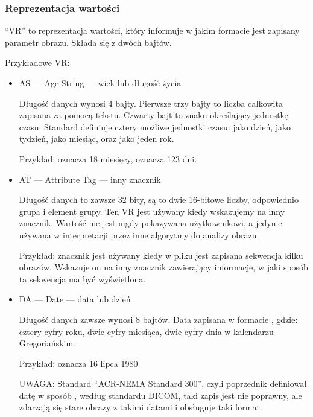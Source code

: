 \subsubsection{Reprezentacja wartości}
\label{sec:dicom-vr}

\enquote{VR} to reprezentacja wartości, który informuje w jakim formacie jest zapisany parametr obrazu.
Składa się z dwóch bajtów.

Przykładowe VR:
\begin{itemize}
    \item AS --- Age String --- wiek lub długość życia

          Długość danych wynosi 4 bajty.
          Pierwsze trzy bajty to liczba całkowita zapisana za pomocą tekstu.
          Czwarty bajt to znaku określający jednostkę czasu.
          Standard definiuje cztery możliwe jednostki czasu:  jako dzień,  jako tydzień,  jako miesiąc, oraz  jako jeden rok.

          Przykład:  oznacza 18 miesięcy,  oznacza 123 dni.

    \item AT --- Attribute Tag --- inny znacznik

          Długość danych to zawsze 32 bity, są to dwie 16-bitowe liczby, odpowiednio grupa i element grupy.
          Ten VR jest używany kiedy wskazujemy na inny znacznik.
          Wartość nie jest nigdy pokazywana użytkownikowi, a jedynie używana w interpretacji przez inne algorytmy do analizy obrazu.

          Przykład: znacznik  jest używany kiedy w pliku jest zapisana sekwencja kilku obrazów.
          Wskazuje on na inny znacznik zawierający informacje, w jaki sposób ta sekwencja ma być wyświetlona.

    \item DA --- Date --- data lub dzień

          Długość danych zawsze wynosi 8 bajtów.
          Data zapisana w formacie , gdzie:  cztery cyfry roku,  dwie cyfry miesiąca,  dwie cyfry dnia w kalendarzu Gregoriańskim.

          Przykład:  oznacza 16 lipca 1980

          UWAGA: Standard \enquote{ACR-NEMA Standard 300}, czyli poprzednik \DICOM definiował datę w sposób , według standardu DICOM, taki zapis jest nie poprawny, ale zdarzają się stare obrazy z takimi datami i  obsługuje taki format.


\end{itemize}
